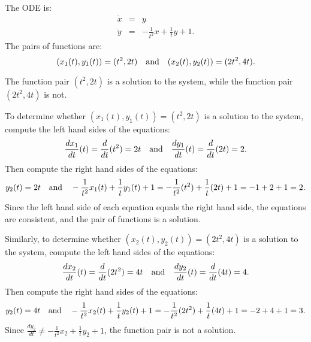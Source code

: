 \documentclass{ximera}
\begin{document}
\begin{exercise} \label{c3.5.5d}
The ODE is:
\begin{eqnarray*}
\dot{x} & = & y  \\
\dot{y} & = &  -\frac{1}{t^2}x + \frac{1}{t}y + 1.
\end{eqnarray*}
The pairs of functions are:
\[
(x_1(t),y_1(t)) = (t^2,2t)  \quad\mbox{and}\quad (x_2(t),y_2(t)) = (2t^2,4t).
\]

\begin{solution}
\ans The function pair $(t^2,2t)$ is a solution to
the system, while the function pair $(2t^2,4t)$ is not.

\soln To determine whether $(x_1(t),y_1(t)) = (t^2,2t)$ is
a solution to the system, compute the left hand sides of the equations:
\[
\frac{dx_1}{dt}(t) = \frac{d}{dt}(t^2) = 2t \quad\mbox{and}\quad
\frac{dy_1}{dt}(t) = \frac{d}{dt}(2t) = 2.
\]
Then compute the right hand sides of the equations:
\[
y_2(t) = 2t \quad\mbox{and}\quad
-\frac{1}{t^2}x_1(t) + \frac{1}{t}y_1(t) + 1 =
-\frac{1}{t^2}(t^2) + \frac{1}{t}(2t) + 1 = -1 + 2 + 1 = 2.
\]
Since the left hand side of each equation equals the right hand side, the
equations are consistent, and the pair of functions is a solution.

\para Similarly, to determine whether $(x_2(t),y_2(t)) = (2t^2,4t)$ is a
solution to the system, compute the left hand sides of the equations:
\[
\frac{dx_2}{dt}(t) = \frac{d}{dt}(2t^2) = 4t \quad\mbox{and}\quad
\frac{dy_2}{dt}(t) = \frac{d}{dt}(4t) = 4.
\]
Then compute the right hand sides of the equations:
\[
y_2(t) = 4t \quad\mbox{and}\quad
-\frac{1}{t^2}x_2(t) + \frac{1}{t}y_2(t) + 1 =
-\frac{1}{t^2}(2t^2) + \frac{1}{t}(4t) + 1 = -2 + 4 + 1 = 3.
\]
Since $\frac{dy_2}{dt} \neq -\frac{1}{t^2}x_2 + \frac{1}{t}y_2 + 1$,
the function pair is not a solution.





\end{solution}
\end{exercise}
\end{document}

